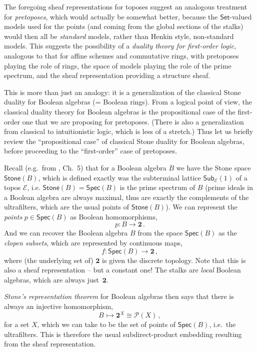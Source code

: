 \documentclass[12pt]{article}
\newcommand{\E}{\ensuremath{\mathcal{E}}}
\newcommand{\Set}{\ensuremath{\mathsf{Set}}}
\newcommand{\mono}{\ensuremath{\rightarrowtail}}
\theoremstyle{remark}
\theoremstyle{definition}
\begin{document}
The foregoing sheaf representations for toposes suggest an analogous treatment for \emph{pretoposes}, which would actually be somewhat better, because the $\Set$-valued models used for the points (and coming from the global sections of the stalks) would then all be \emph{standard} models, rather than Henkin style, non-standard models. This suggests the possibility of a \emph{duality theory for first-order logic}, analogous to that for affine schemes and commutative rings, with  pretoposes playing the role of rings, the space of models playing the role of the prime spectrum, and the sheaf representation providing a structure sheaf.

This is more than just an analogy: it is a generalization of the classical Stone duality for Boolean algebras (= Boolean rings). From a logical point of view, the classical duality theory for Boolean algebras is the propositional case of the first-order one that we are proposing for pretoposes.  (There is also a generalization from classical to intuitionistic logic, which is less of a stretch.)  Thus let us briefly review the ``propositional case'' of classical Stone duality for Boolean algebras, before proceeding to the ``first-order'' case of pretoposes.  

Recall (e.g.\ from \cite{J}, Ch.~5) that for a Boolean algebra $B$ we have the Stone space $\mathsf{Stone}(B)$, which is defined exactly was the subterminal lattice $\mathsf{Sub}_{\E}(1)$ of a topos $\E$, i.e. $\mathsf{Stone}(B)=\mathsf{Spec}(B)$ is the prime spectrum of $B$ (prime ideals in a Boolean algebra are always maximal, thus are exactly the complements of the ultrafilters, which are the usual points of $\mathsf{Stone}(B)$).  We can represent the \emph{points} $p\in \mathsf{Spec}(B)$ as Boolean homomorphisms,
\[
p : B\to \mathbf{2}\,.
\]
And we can recover the Boolean algebra $B$ from the space $\mathsf{Spec}(B)$ as the \emph{clopen subsets}, which are represented by continuous maps,
\[
f : \mathsf{Spec}(B)\to \mathbf{2}\,,
\]
where (the underlying set of) $\mathbf{2}$ is given the discrete topology. Note that this is also a sheaf representation -- but a constant one!  The stalks are  \emph{local} Boolean algebras, which are always just~$\mathbf{2}$.  

\emph{Stone's representation theorem} for Boolean algebras then says that there is always an injective homomorphism,
\[
B \mono \mathbf{2}^X \cong \mathcal{P}(X)\,,
\]
for a set $X$, which we can take to be the set of points of $\mathsf{Spec}(B)$, i.e.\ the ultrafilters.  This is therefore the usual subdirect-product embedding resulting from the sheaf representation.
\end{document}
